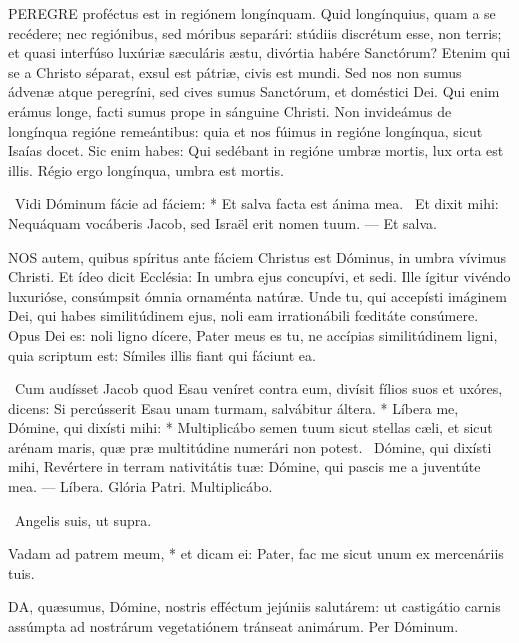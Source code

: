 
\lettrine[lines=2]{P}{EREGRE} proféctus est in regiónem longínquam. Quid longínquius, quam a se recédere; nec regiónibus, sed móribus separári: stúdiis discrétum esse, non terris; et quasi interfúso luxúriæ sæculáris æstu, divórtia habére Sanctórum? Etenim qui se a Christo séparat, exsul est pátriæ, civis est mundi. Sed nos non sumus ádvenæ atque peregríni, sed cives sumus Sanctórum, et doméstici Dei. Qui enim erámus longe, facti sumus prope in sánguine Christi. Non invideámus de longínqua regióne remeántibus: quia et nos fúimus in regióne longínqua, sicut Isaías docet. Sic enim habes: Qui sedébant in regióne umbræ mortis, lux orta est illis. Régio ergo longínqua, umbra est mortis.

\R\ Vidi Dóminum fácie ad fáciem: * Et salva facta est ánima mea. \V\ Et dixit mihi: Nequáquam vocáberis Jacob, sed Israël erit nomen tuum. --- Et salva.


\lettrine[lines=2]{N}{OS} autem, quibus spíritus ante fáciem Christus est Dóminus, in umbra vívimus Christi. Et ídeo dicit Ecclésia: In umbra ejus concupívi, et sedi. Ille ígitur vivéndo luxurióse, consúmpsit ómnia ornaménta natúræ. Unde tu, qui accepísti imáginem Dei, qui habes similitúdinem ejus, noli eam irrationábili fœditáte consúmere. Opus Dei es: noli ligno dícere, Pater meus es tu, ne accípias similitúdinem ligni, quia scriptum est: Símiles illis fiant qui fáciunt ea.

\R\ Cum audísset Jacob quod Esau veníret contra eum, divísit fílios suos et uxóres, dicens: Si percússerit Esau unam turmam, salvábitur áltera. * Líbera me, Dómine, qui dixísti mihi: * Multiplicábo semen tuum sicut stellas cæli, et sicut arénam maris, quæ præ multitúdine numerári non potest. \V\ Dómine, qui dixísti mihi, Revértere in terram nativitátis tuæ: Dómine, qui pascis me a juventúte mea. --- Líbera. Glória Patri. Multiplicábo.

\V\ Angelis suis, ut supra.

 Vadam ad patrem meum, * et dicam ei: Pater, fac me sicut unum ex mercenáriis tuis.


\lettrine[lines=2]{D}{A}, quæsumus, Dómine, nostris efféctum jejúniis salutárem: ut castigátio carnis assúmpta ad nostrárum vegetatiónem tránseat animárum. Per Dóminum.


